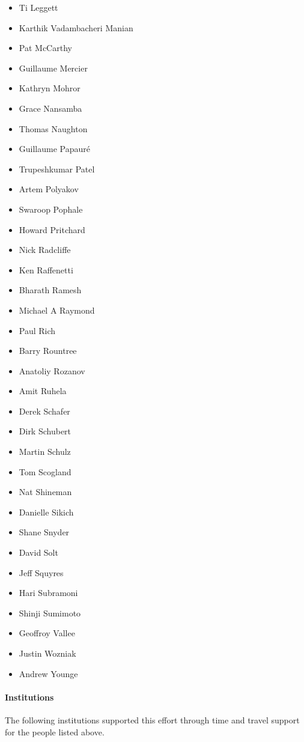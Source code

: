 \begin{itemize}
    \item Ti Leggett
    \item Karthik Vadambacheri Manian
    \item Pat McCarthy
    \item Guillaume Mercier
    \item Kathryn Mohror
    \item Grace Nansamba
    \item Thomas Naughton
    \item Guillaume Papauré
    \item Trupeshkumar Patel
    \item Artem Polyakov
    \item Swaroop Pophale
    \item Howard Pritchard
    \item Nick Radcliffe
    \item Ken Raffenetti
    \item Bharath Ramesh
    \item Michael A Raymond
    \item Paul Rich
    \item Barry Rountree
    \item Anatoliy Rozanov
    \item Amit Ruhela
    \item Derek Schafer
    \item Dirk Schubert
    \item Martin Schulz
    \item Tom Scogland
    \item Nat Shineman
    \item Danielle Sikich
    \item Shane Snyder
    \item David Solt
    \item Jeff Squyres
    \item Hari Subramoni
    \item Shinji Sumimoto
    \item Geoffroy Vallee
    \item Justin Wozniak
    \item Andrew Younge
\end{itemize}

\paragraph*{Institutions}

The following institutions supported this effort through time and travel support for the people listed above.

